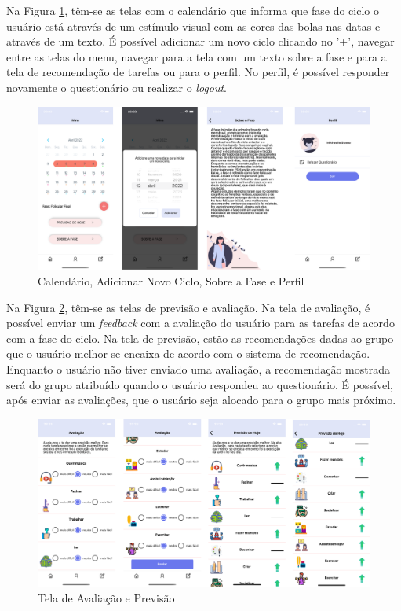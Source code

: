 Na Figura \ref{fig21}, têm-se as telas com o calendário que informa que fase do ciclo o usuário está através 
de um estímulo visual com as cores das bolas nas datas e através de um texto. É possível adicionar um novo ciclo 
clicando no '+', navegar entre as telas do menu, navegar para a tela com um texto sobre a fase e para a tela 
de recomendação de tarefas ou para o perfil. No perfil, é possível responder novamente o questionário ou 
realizar o \emph{logout}.

\begin{figure}[ht]
	\caption{Calendário, Adicionar Novo Ciclo, Sobre a Fase e Perfil}
	\begin{center}
	\includegraphics[keepaspectratio=true,scale=0.08]{figuras/aplicativo2.png}
	\end{center}
    \label{fig21}
\end{figure}


Na Figura \ref{fig22}, têm-se as telas de previsão e avaliação. Na tela de avaliação, é possível enviar 
um \emph{feedback} com a avaliação do usuário para as tarefas de acordo com a fase do ciclo. Na tela de 
previsão, estão as recomendações dadas ao grupo que o usuário melhor se encaixa de acordo com o sistema de recomendação.
Enquanto o usuário não tiver enviado uma avaliação, a recomendação mostrada será do grupo atribuído quando o 
usuário respondeu ao questionário. É possível, 
após enviar as avaliações, que o usuário seja alocado para o grupo mais próximo.

\begin{figure}[ht]
	\caption{Tela de Avaliação e Previsão}
	\begin{center}
	\includegraphics[keepaspectratio=true,scale=0.08]{figuras/aplicativo3.png}
	\end{center}
    \label{fig22}
\end{figure}

